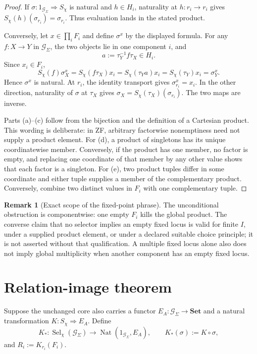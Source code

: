 \documentclass[11pt]{article}
\theoremstyle{definition}
\newtheorem{remark}[theorem]{Remark}
\newcommand{\G}{\mathcal G_{\Sigma}}
\newcommand{\Sel}{\operatorname{Sel}_{\chi}}
\newcommand{\Nat}{\operatorname{Nat}}
\begin{document}
\begin{proof}
If \(\sigma:1_{\G}\Rightarrow S_\chi\) is natural and \(h\in H_i\),
naturality at \(h:r_i\to r_i\) gives
\(S_\chi(h)(\sigma_{r_i})=\sigma_{r_i}\). Thus evaluation lands in the
stated product.

Conversely, let \(x\in\prod_iF_i\) and define \(\sigma^x\) by the displayed
formula. For any \(f:X\to Y\) in \(\G\), the two objects lie in one
component \(i\), and
\[
  a:=\tau_Y^{-1}f\tau_X\in H_i.
\]
Since \(x_i\in F_i\),
\[
  S_\chi(f)\sigma^x_X
  =S_\chi(f\tau_X)x_i
  =S_\chi(\tau_Y a)x_i
  =S_\chi(\tau_Y)x_i
  =\sigma^x_Y.
\]
Hence \(\sigma^x\) is natural. At \(r_i\), the identity transport gives
\(\sigma^x_{r_i}=x_i\). In the other direction, naturality of \(\sigma\)
at \(\tau_X\) gives
\(\sigma_X=S_\chi(\tau_X)(\sigma_{r_i})\). The two maps are inverse.

Parts (a)--(c) follow from the bijection and the definition of a Cartesian
product. This wording is deliberate: in ZF, arbitrary factorwise
nonemptiness need not supply a product element. For (d), a product of
singletons has its unique coordinatewise member. Conversely, if the product
has one member, no factor is empty, and replacing one coordinate of that
member by any other value shows that each factor is a singleton. For (e),
two product tuples differ in some coordinate and either tuple supplies a
member of the complementary product. Conversely, combine two distinct
values in \(F_i\) with one complementary tuple.
\end{proof}

\begin{remark}[Exact scope of the fixed-point phrase]
The unconditional obstruction is componentwise: one empty \(F_i\) kills the
global product. The converse claim that no selector implies an empty fixed
locus is valid for finite \(I\), under a supplied product element, or under
a declared suitable choice principle; it is not asserted without that
qualification. A multiple fixed locus alone also does not imply global
multiplicity when another component has an empty fixed locus.
\end{remark}

\section{Relation-image theorem}

Suppose the unchanged core also carries a functor \(E_A:\G\to\mathbf{Set}\)
and a natural transformation \(K:S_\chi\Rightarrow E_A\). Define
\[
  K_*:\Sel(\G)\longrightarrow\Nat(1_{\G},E_A),
  \qquad K_*(\sigma):=K\circ\sigma,
\]
and \(R_i:=K_{r_i}(F_i)\).
\end{document}
